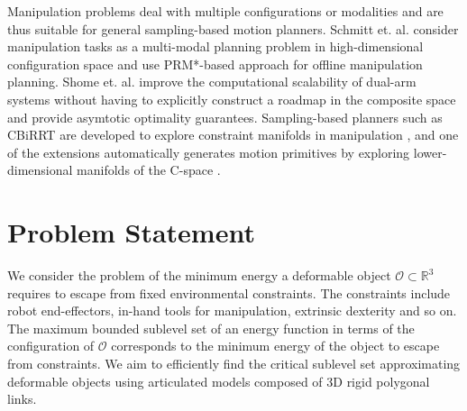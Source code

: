 \documentclass[conference]{IEEEtran}
\begin{document}
Manipulation problems deal with multiple configurations or modalities and are thus suitable for general sampling-based motion planners\cite{}. 
Schmitt et. al.\cite{} consider manipulation tasks as a multi-modal planning problem in high-dimensional configuration space and use PRM*-based approach for offline manipulation planning.
Shome et. al. \cite{} improve the computational scalability of dual-arm systems without having to explicitly construct a roadmap in the composite space and provide asymtotic optimality guarantees.   
Sampling-based planners such as CBiRRT are developed to explore constraint manifolds in manipulation \cite{}\cite{}, and one of the extensions automatically generates motion primitives by exploring lower-dimensional manifolds of the C-space \cite{}.

\section{Problem Statement}
We consider the problem of the minimum energy a deformable object $\mathcal{O}\subset\mathbb{R}^3$ requires to escape from fixed environmental constraints.
The constraints include robot end-effectors, in-hand tools for manipulation, extrinsic dexterity and so on.
The maximum bounded sublevel set of an energy function in terms of the configuration of $\mathcal{O}$ corresponds to the minimum energy of the object to escape from constraints. 
We aim to efficiently find the critical sublevel set approximating deformable objects using  articulated models composed of 3D rigid polygonal links. 
\end{document}
